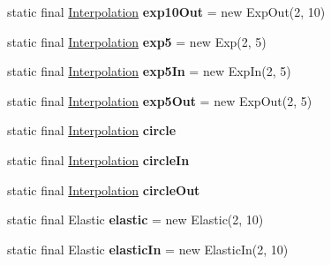 \begin{DoxyCompactItemize}
\item 
\hypertarget{classairhockeyjava_1_1util_1_1_interpolation_a25773ce4f926d7cd547d0b51c5bdbb8f}{}static final \hyperlink{classairhockeyjava_1_1util_1_1_interpolation}{Interpolation} {\bfseries exp10\+Out} = new Exp\+Out(2, 10)\label{classairhockeyjava_1_1util_1_1_interpolation_a25773ce4f926d7cd547d0b51c5bdbb8f}

\item 
\hypertarget{classairhockeyjava_1_1util_1_1_interpolation_a172776b5140ebd618143063741b785eb}{}static final \hyperlink{classairhockeyjava_1_1util_1_1_interpolation}{Interpolation} {\bfseries exp5} = new Exp(2, 5)\label{classairhockeyjava_1_1util_1_1_interpolation_a172776b5140ebd618143063741b785eb}

\item 
\hypertarget{classairhockeyjava_1_1util_1_1_interpolation_a36d901b51b5ee113a655bde290668706}{}static final \hyperlink{classairhockeyjava_1_1util_1_1_interpolation}{Interpolation} {\bfseries exp5\+In} = new Exp\+In(2, 5)\label{classairhockeyjava_1_1util_1_1_interpolation_a36d901b51b5ee113a655bde290668706}

\item 
\hypertarget{classairhockeyjava_1_1util_1_1_interpolation_a5c951fa614fe28438720579f014636af}{}static final \hyperlink{classairhockeyjava_1_1util_1_1_interpolation}{Interpolation} {\bfseries exp5\+Out} = new Exp\+Out(2, 5)\label{classairhockeyjava_1_1util_1_1_interpolation_a5c951fa614fe28438720579f014636af}

\item 
static final \hyperlink{classairhockeyjava_1_1util_1_1_interpolation}{Interpolation} {\bfseries circle}
\item 
static final \hyperlink{classairhockeyjava_1_1util_1_1_interpolation}{Interpolation} {\bfseries circle\+In}
\item 
static final \hyperlink{classairhockeyjava_1_1util_1_1_interpolation}{Interpolation} {\bfseries circle\+Out}
\item 
\hypertarget{classairhockeyjava_1_1util_1_1_interpolation_a173288c429d6b1f2900d1bd042886f43}{}static final Elastic {\bfseries elastic} = new Elastic(2, 10)\label{classairhockeyjava_1_1util_1_1_interpolation_a173288c429d6b1f2900d1bd042886f43}

\item 
\hypertarget{classairhockeyjava_1_1util_1_1_interpolation_a513e01c569c340d583885d550ea4b5e7}{}static final Elastic {\bfseries elastic\+In} = new Elastic\+In(2, 10)\label{classairhockeyjava_1_1util_1_1_interpolation_a513e01c569c340d583885d550ea4b5e7}


\end{DoxyCompactItemize}
